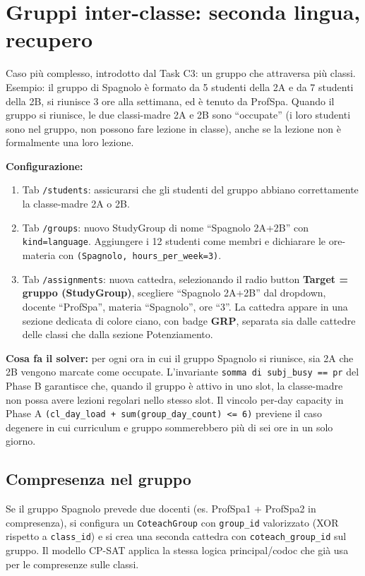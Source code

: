 \section{Gruppi inter-classe: seconda lingua, recupero}

Caso pi\`u complesso, introdotto dal Task C3: un gruppo che
attraversa pi\`u classi. Esempio: il gruppo di Spagnolo \`e
formato da 5 studenti della 2A e da 7 studenti della 2B,
si riunisce 3 ore alla settimana, ed \`e tenuto da
ProfSpa. Quando il gruppo si riunisce, le due classi-madre
2A e 2B sono ``occupate'' (i loro studenti sono nel gruppo,
non possono fare lezione in classe), anche se la lezione
non \`e formalmente una loro lezione.

\textbf{Configurazione:}
\begin{enumerate}
\item Tab \texttt{/students}: assicurarsi che gli studenti
del gruppo abbiano correttamente la classe-madre 2A o 2B.
\item Tab \texttt{/groups}: nuovo StudyGroup di nome
``Spagnolo 2A+2B'' con \texttt{kind=language}. Aggiungere i
12 studenti come membri e dichiarare le ore-materia con
\texttt{(Spagnolo, hours\_per\_week=3)}.
\item Tab \texttt{/assignments}: nuova cattedra,
selezionando il radio button \textbf{Target = gruppo
(StudyGroup)}, scegliere ``Spagnolo 2A+2B'' dal dropdown,
docente ``ProfSpa'', materia ``Spagnolo'', ore ``3''. La
cattedra appare in una sezione dedicata di colore ciano,
con badge \textbf{GRP}, separata sia dalle cattedre delle
classi che dalla sezione Potenziamento.
\end{enumerate}

\textbf{Cosa fa il solver:} per ogni ora in cui il gruppo
Spagnolo si riunisce, sia 2A che 2B vengono marcate come
occupate. L'invariante \texttt{somma di subj\_busy == pr}
del Phase B garantisce che, quando il gruppo \`e attivo in
uno slot, la classe-madre non possa avere lezioni regolari
nello stesso slot. Il vincolo per-day capacity in Phase A
\texttt{(cl\_day\_load + sum(group\_day\_count) <= 6)}
previene il caso degenere in cui curriculum e gruppo
sommerebbero pi\`u di sei ore in un solo giorno.

\subsection{Compresenza nel gruppo}

Se il gruppo Spagnolo prevede due docenti
(es. ProfSpa1 + ProfSpa2 in compresenza), si configura un
\texttt{CoteachGroup} con \texttt{group\_id} valorizzato
(XOR rispetto a \texttt{class\_id}) e si crea una seconda
cattedra con \texttt{coteach\_group\_id} sul gruppo. Il
modello CP-SAT applica la stessa logica principal/codoc che
gi\`a usa per le compresenze sulle classi.

